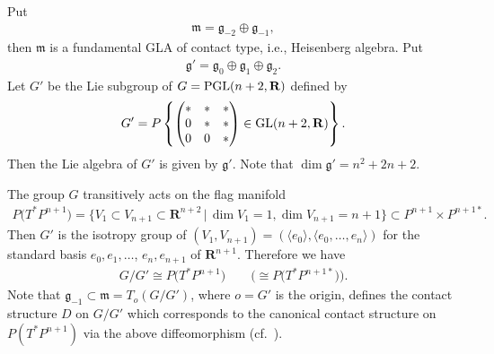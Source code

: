 \documentclass[pdftex]{sigma}
\begin{document}
Put
\begin{gather*}
\mathfrak{m}= \mathfrak{g}_{-2}\oplus \mathfrak{g}_{-1},
\end{gather*}
then $\mathfrak{m}$ is a fundamental GLA of contact type, i.e., Heisenberg
algebra.
Put
\begin{gather*}
\mathfrak{g}'=\mathfrak{g}_0 \oplus \mathfrak{g}_1 \oplus
\mathfrak{g}_2.
\end{gather*}
Let $G'$ be the Lie subgroup of $G = {\rm PGL}(n+2, {\mathbf{R}})$ def\/ined by
\begin{gather*}
G' = P\left\{
\begin{pmatrix}
* & * & * \\
0 & * & * \\
0 & 0 & *
\end{pmatrix}
\in
{\rm GL}(n+2, {\mathbf{R}})
\right\}.
\end{gather*}
Then the Lie algebra of $G'$ is given by $\mathfrak{g}'$. Note that
$\dim \mathfrak{g}' = n^2 + 2n + 2$.

The group $G$ transitively acts on the f\/lag manifold
\begin{gather*}
P\big(T^*P^{n+1}\big) = \big\{ V_1 \subset V_{n+1} \subset {\mathbf{R}}^{n+2} \,|\,
\dim V_1 = 1, \dim V_{n+1} = n + 1 \big\} \subset P^{n+1}\times P^{n+1*}.
\end{gather*}
Then $G'$ is the isotropy group of $(V_1, V_{n+1}) = (\langle e_0 \rangle,
\langle e_0, \dots, e_n \rangle)$ for the standard basis $e_0, e_1, \dots$,
$e_n, e_{n+1}$ of ${\mathbf{R}}^{n+1}$.
Therefore we have
\begin{gather*}
G/G' \cong P\big(T^*P^{n+1}\big) \qquad \big(\cong P\big(T^*P^{n+1*}\big)\big).
\end{gather*}
Note that $\mathfrak{g}_{-1} \subset \mathfrak{m} = T_o(G/G')$, where
$o = G'$ is the origin,
def\/ines the contact structure $D$ on $G/G'$ which corresponds to
the canonical contact structure
on $P(T^*P^{n+1})$ via the above dif\/feomorphism (cf.~\cite{I-M}).
\end{document}
